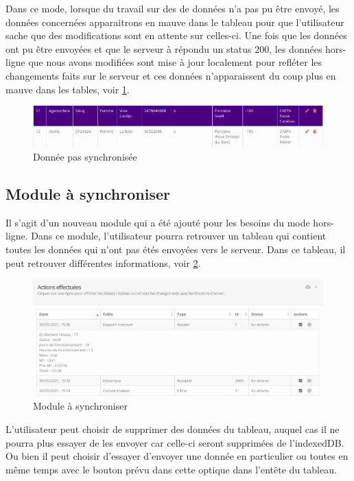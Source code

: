 \documentclass{EPL-master-thesis-covers-FR}
\begin{document}
				Dans ce mode, lorsque du travail sur des de données n'a pas pu être envoyé, les données concernées apparaitrons en mauve dans le tableau pour que l'utilisateur sache que des modifications sont en attente sur celles-ci. Une fois que les données ont pu être envoyées et que le serveur à répondu un status 200, les données hors-ligne que nous avons modifiées sont mise à jour localement pour refléter les changements faits sur le serveur et ces données n'apparaissent du coup plus en mauve dans les tables, voir \ref{fig:purple}. 
				
				\begin{figure}[H]
					\centering
					\includegraphics[width=1\textwidth]{images/purple}
					\caption{Donnée pas synchronisée}
					\label{fig:purple}
				\end{figure}
							
			\subsection{Module à synchroniser}
				Il s'agit d'un nouveau module qui a été ajouté pour les besoins du mode hors-ligne. Dans ce module, l'utilisateur pourra retrouver un tableau qui contient toutes les données qui n'ont pas étés envoyées vers le serveur. Dans ce tableau, il peut retrouver différentes informations, voir \ref{fig:tosync}.
				
				\begin{figure}[H]
					\centering
					\includegraphics[width=1\textwidth]{images/tosync}
					\caption{Module à synchroniser}
					\label{fig:tosync}
				\end{figure}
							
				L'utilisateur peut choisir de supprimer des données du tableau, auquel cas il ne pourra plus essayer de les envoyer car celle-ci seront supprimées de l'indexedDB. Ou bien il peut choisir d'essayer d'envoyer une donnée en particulier ou toutes en même temps avec le bouton prévu dans cette optique dans l'entête du tableau.
			
\end{document}
